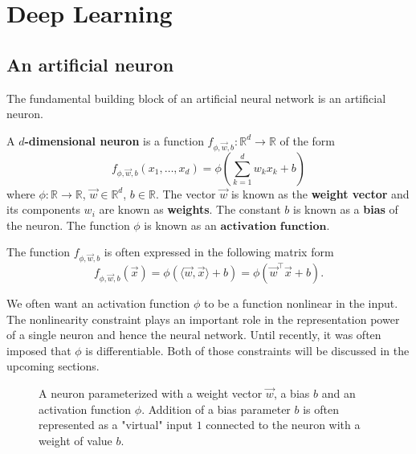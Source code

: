 \section{Deep Learning}
\label{section:introduction:deep-learning}
\subsection{An artificial neuron}
The fundamental building block of an artificial neural network is an artificial neuron.
\begin{definition}[neuron]
A \textbf{$d$-dimensional neuron} is a function $f_{\phi, \vec{w}, b} : \mathbb{R}^d \to \mathbb{R}$ of the form \begin{equation*}
    f_{\phi, \vec{w}, b} (x_1, \ldots, x_d) = \phi \left (\sum_{k=1}^d w_k x_k + b \right )
\end{equation*}
where $\phi : \mathbb{R} \to \mathbb{R}$, $\vec{w} \in \mathbb{R}^d$, $b \in \mathbb{R}$.
The vector $\vec{w}$ is known as the \textbf{weight vector} and its components $w_i$ are known as \textbf{weights}. The constant $b$ is known as a \textbf{bias} of the neuron. The function $\phi$ is known as an $\textbf{activation function}$.
\end{definition}
\begin{remark}
The function $f_{\phi, \vec{w}, b}$ is often expressed in the following matrix form
\begin{equation*}
    f_{\phi, \vec{w}, b} (\vec{x}) =  \phi (\langle \vec{w}, \vec{x} \rangle + b ) = \phi ( \vec{w}^\top \vec{x} + b ).
\end{equation*}
\end{remark}
\begin{remark}
We often want an activation function $\phi$ to be a function nonlinear in the input. The nonlinearity constraint plays an important role in the representation power of a single neuron and hence the neural network. Until recently, it was often imposed that $\phi$ is differentiable. Both of those constraints will be discussed in the upcoming sections. 
\end{remark}
\begin{figure}[h]
    \centering
    \caption{A neuron parameterized with a weight vector $\vec{w}$, a bias $b$ and an activation function $\phi$. Addition of a bias parameter $b$ is often represented as a "virtual" input $1$ connected to the neuron with a weight of value $b$.}
    \label{fig:neuron}
\end{figure}
